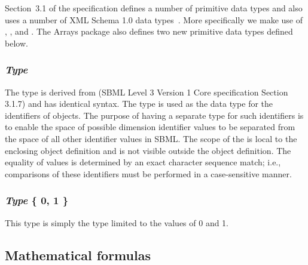 Section~3.1 of the \sbmlthreecore specification defines a number of primitive data types and also uses a number of XML Schema 1.0 data types~\citep{biron:2000}.  More specifically we make use of , , and .  The Arrays package also defines two new primitive data types defined below.

\subsubsection{\emph{Type} }

The type  is derived from  (SBML Level 3 Version 1 Core specification Section 3.1.7) and has identical syntax. The  type is used as the data type for the identifiers of \Dimension objects. The purpose of having a separate type for such identifiers is to enable the space of possible dimension identifier values to be separated from the space of all other identifier values in SBML.  The scope of the  is local to the enclosing object definition and is not visible outside the object definition.  The equality of  values is determined by an exact character sequence match; i.e., comparisons of these identifiers must be performed in a case-sensitive manner.

\subsubsection{\emph{Type} \{ 0, 1 \}}

This type is simply the  type limited to the values of 0 and 1.

\subsection{Mathematical formulas}


